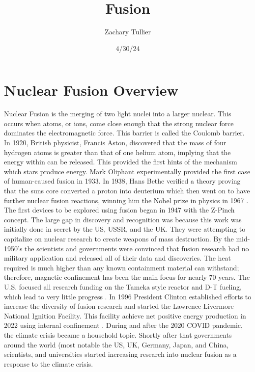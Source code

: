 \documentclass[English]{article}
\begin{document}
\title{Fusion}

\author[1]{Zachary Tullier}
\date{4/30/24}

\maketitle

\begin{abstract}
    
\end{abstract}


\section{Nuclear Fusion Overview}
Nuclear Fusion is the merging of two light nuclei into a larger nuclear. This occurs when atoms, or ions, come close enough that the strong nuclear force dominates the electromagnetic force. This barrier is called the Coulomb barrier. 
In 1920, British physicist, Francis Aston, discovered that the mass of four hydrogen atoms is greater than that of one helium atom, implying that the energy within can be released. This provided the first hints of the mechanism which stars produce energy. Mark Oliphant experimentally  provided the first case of human-caused fusion in 1933.
In 1938, Hans Bethe verified a theory proving that the suns core converted a proton into deuterium which then went on to have further nuclear fusion reactions, winning him the Nobel prize in physics in 1967 \cite{HansBethe}. The first devices to be explored using fusion began in 1947 with the Z-Pinch concept. The large gap in discovery and recognition was because this work was initially done in secret by the US, USSR, and the UK. They were attempting to capitalize on nuclear research to create weapons of mass destruction. By the mid-1950's the scientists and governments were convinced that fusion research had no military application and released all of their data and discoveries. The heat required is much higher than any known containment material can withstand; therefore, magnetic confinement has been the main focus for nearly 70 years. The U.S. focused all research funding on the Tameka style reactor and D-T fueling, which lead to very little progress \cite{FusHis}. In 1996 President Clinton established efforts to increase the diversity of fusion research and started the Lawrence Livermore National Ignition Facility. This facility achieve net positive energy production in 2022 using internal confinement \cite{Heumul}. During and after the 2020 COVID pandemic, the climate crisis became a household topic. Shortly after that governments around the world (most notable the US, UK, Germany, Japan, and China, scientists, and universities started increasing research into nuclear fusion as a response to the climate crisis. 
\end{document}
